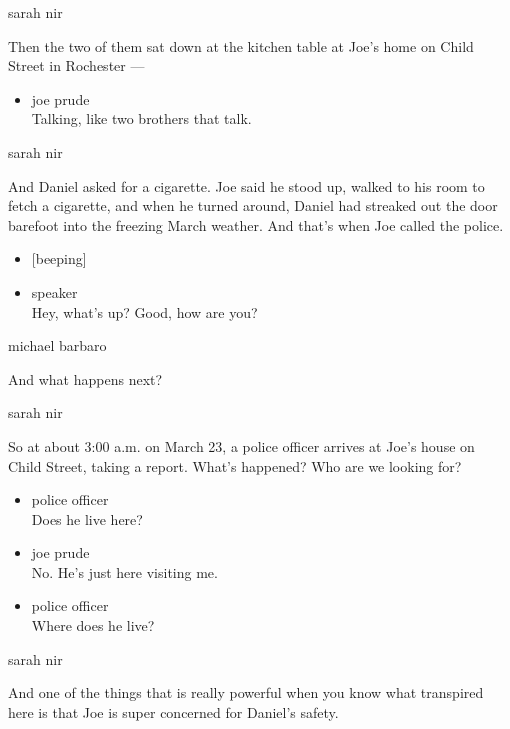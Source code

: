 sarah nir

Then the two of them sat down at the kitchen table at Joe's home on
Child Street in Rochester ---

\begin{itemize}
\tightlist
\item
  joe prude\\
  Talking, like two brothers that talk.
\end{itemize}

sarah nir

And Daniel asked for a cigarette. Joe said he stood up, walked to his
room to fetch a cigarette, and when he turned around, Daniel had
streaked out the door barefoot into the freezing March weather. And
that's when Joe called the police.

\begin{itemize}
\item
  {[}beeping{]}
\item
  speaker\\
  Hey, what's up? Good, how are you?
\end{itemize}

michael barbaro

And what happens next?

sarah nir

So at about 3:00 a.m. on March 23, a police officer arrives at Joe's
house on Child Street, taking a report. What's happened? Who are we
looking for?

\begin{itemize}
\item
  police officer\\
  Does he live here?
\item
  joe prude\\
  No. He's just here visiting me.
\item
  police officer\\
  Where does he live?
\end{itemize}

sarah nir

And one of the things that is really powerful when you know what
transpired here is that Joe is super concerned for Daniel's safety.

